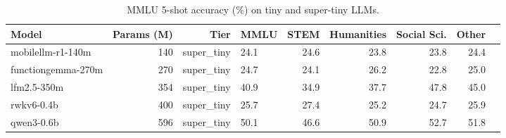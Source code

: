 \begin{table}[t]
\centering
\small
\caption{MMLU 5-shot accuracy (\%) on tiny and super-tiny LLMs.}
\label{tab:mmlu}
\begin{tabular}{lrrlrrrrr}
\toprule
Model & Params (M) & Tier & MMLU & STEM & Humanities & Social Sci. & Other \\
\midrule
mobilellm-r1-140m & 140 & super\_tiny & 24.1 & 24.6 & 23.8 & 23.8 & 24.4 \\
functiongemma-270m & 270 & super\_tiny & 24.7 & 24.1 & 26.2 & 22.8 & 25.0 \\
lfm2.5-350m & 354 & super\_tiny & 40.9 & 34.9 & 37.7 & 47.8 & 45.0 \\
rwkv6-0.4b & 400 & super\_tiny & 25.7 & 27.4 & 25.2 & 24.7 & 25.9 \\
qwen3-0.6b & 596 & super\_tiny & 50.1 & 46.6 & 50.9 & 52.7 & 51.8 \\
\bottomrule
\end{tabular}

\end{table}
